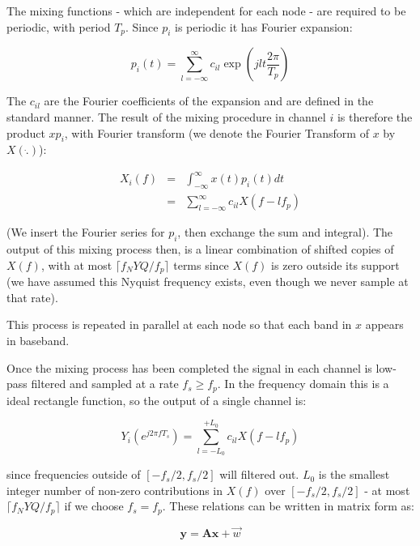 \documentclass[12pt]{report}
\begin{document}
The mixing functions - which are independent for each node - are required to be periodic, with period \(T_p\). Since \(p_i\) is periodic it has Fourier expansion:

\begin{equation}
p_i\left(t\right) = \sum_{l=-\infty}^{\infty} c_{il} \exp\left({jlt\frac{2\pi}{T_p}}\right)
\end{equation}

The \(c_{il}\) are the Fourier coefficients of the expansion and are defined in the standard manner. The result of the mixing procedure in channel \(i\) is therefore the product \(xp_i\), with Fourier transform (we denote the Fourier Transform of \(x\) by \(X\left( \dot{.} \right)\)):

\begin{align}
X_{i}\left(f\right) &=& \int_{-\infty}^{\infty} x\left(t\right) p_i\left(t\right) dt \nonumber
\\ &=& \sum_{l=-\infty}^{\infty} c_{il} X\left(f-lf_p\right)
\end{align}

(We insert the Fourier series for \(p_i\), then exchange the sum and integral). The output of this mixing process then, is a linear combination of shifted copies of \(X\left(f\right)\), with at most \(\lceil f_NYQ/f_p\rceil\) terms since \(X\left(f\right)\) is zero outside its support (we have assumed this Nyquist frequency exists, even though we never sample at that rate).

This process is repeated in parallel at each node so that each band in \(x\) appears in baseband.

Once the mixing process has been completed the signal in each channel is low-pass filtered and sampled at a rate \(f_s \geq f_p\). In the frequency domain this is a ideal rectangle function, so the output of a single channel is:

\begin{equation}
Y_i\left(e^{j 2 \pi f T_s }\right) = \sum_{l = -L_0}^{+L_0} c_{il} X\left(f-lf_p\right)
\end{equation}

since frequencies outside of \([-f_s/2, f_s/2]\) will filtered out. \(L_0\) is the smallest integer number of non-zero contributions in \(X\left(f\right)\) over \([-f_s/2, f_s/2]\) - at most \(\lceil f_NYQ/f_p\rceil\) if we choose \(f_s = f_p\). These relations can be written in matrix form as:

\begin{equation}
\textbf{y} = \textbf{A}\textbf{x} + \vec{w}
\label{system}
\end{equation}
\end{document}
